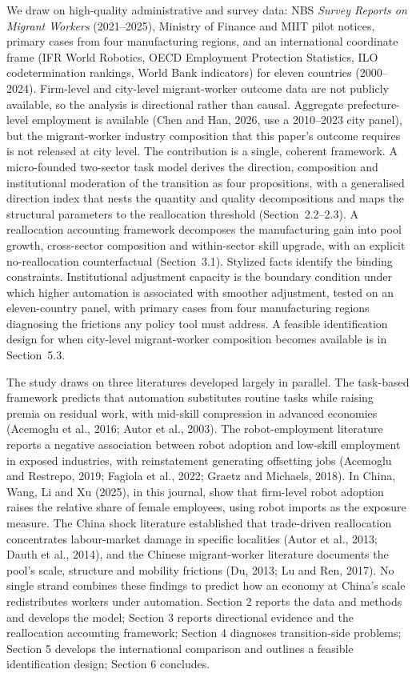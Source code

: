 \documentclass[12pt]{article}
\begin{document}
We draw on high-quality administrative and survey data: NBS \emph{Survey Reports on Migrant Workers} (2021--2025), Ministry of Finance and MIIT pilot notices, primary cases from four manufacturing regions, and an international coordinate frame (IFR World Robotics, OECD Employment Protection Statistics, ILO codetermination rankings, World Bank indicators) for eleven countries (2000--2024). Firm-level and city-level migrant-worker outcome data are not publicly available, so the analysis is directional rather than causal. Aggregate prefecture-level employment is available (Chen and Han, 2026, use a 2010--2023 city panel), but the migrant-worker industry composition that this paper's outcome requires is not released at city level. The contribution is a single, coherent framework. A micro-founded two-sector task model derives the direction, composition and institutional moderation of the transition as four propositions, with a generalised direction index that nests the quantity and quality decompositions and maps the structural parameters to the reallocation threshold (Section~2.2--2.3). A reallocation accounting framework decomposes the manufacturing gain into pool growth, cross-sector composition and within-sector skill upgrade, with an explicit no-reallocation counterfactual (Section~3.1). Stylized facts identify the binding constraints. Institutional adjustment capacity is the boundary condition under which higher automation is associated with smoother adjustment, tested on an eleven-country panel, with primary cases from four manufacturing regions diagnosing the frictions any policy tool must address. A feasible identification design for when city-level migrant-worker composition becomes available is in Section~5.3.

The study draws on three literatures developed largely in parallel. The task-based framework predicts that automation substitutes routine tasks while raising premia on residual work, with mid-skill compression in advanced economies (Acemoglu et al., 2016; Autor et al., 2003). The robot-employment literature reports a negative association between robot adoption and low-skill employment in exposed industries, with reinstatement generating offsetting jobs (Acemoglu and Restrepo, 2019; Fagiola et al., 2022; Graetz and Michaels, 2018). In China, Wang, Li and Xu (2025), in this journal, show that firm-level robot adoption raises the relative share of female employees, using robot imports as the exposure measure. The China shock literature established that trade-driven reallocation concentrates labour-market damage in specific localities (Autor et al., 2013; Dauth et al., 2014), and the Chinese migrant-worker literature documents the pool's scale, structure and mobility frictions (Du, 2013; Lu and Ren, 2017). No single strand combines these findings to predict how an economy at China's scale redistributes workers under automation. Section 2 reports the data and methods and develops the model; Section 3 reports directional evidence and the reallocation accounting framework; Section 4 diagnoses transition-side problems; Section 5 develops the international comparison and outlines a feasible identification design; Section 6 concludes.
\end{document}
